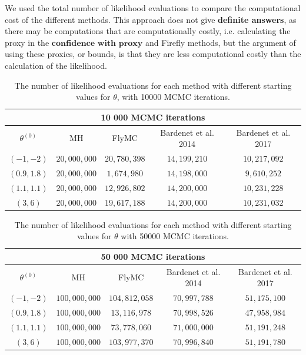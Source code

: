  We used the total number of likelihood evaluations to compare the computational cost of the different methods. This approach does not give \textbf{definite answers}, as there may be computations that are computationally costly, i.e. calculating the proxy in the $\textbf{confidence with proxy}$ and Firefly methods, but the argument of using these proxies, or bounds, is that they are less computational costly than the calculation of the likelihood. 
 
 \begin{table}[ht]
    \centering
\begin{tabular}{|c|c|c|c|c|}
  \hline
    \multicolumn{5}{|c|}{10 000 MCMC iterations} \\
    \hline
\hline
        $\theta^{\left(0\right)}$ &  MH & FlyMC & Bardenet et al. 2014 & Bardenet et al. 2017\\ 
         \hline \hline$\left(-1, -2\right)$  & $20,000,000$ & $20,780,398$ & $14,199,210$ & $10,217,092$ \\
        $\left(0.9, 1.8\right)$ & $20,000,000$ & $1,674,980$ & $14,198,000$ & $9,610,252$ \\
        $\left(1.1, 1.1\right)$ & $20,000,000$ & $12,926,802$ & $14,200,000$ & $10,231,228$
        \\ $ \left(3, 6\right) $ & $20,000,000$ & $19,617,188$ & $14,200,000$ & $10,231,032$
        \\ \hline
\end{tabular}
\caption{The number of likelihood evaluations for each method with different starting values for $\theta$, with 10000 MCMC iterations.}
\label{tab:ll_evals_10k}
\end{table} 

\begin{table}[ht]
    \centering
\begin{tabular}{|c|c|c|c|c|}
  \hline
    \multicolumn{5}{|c|}{50 000 MCMC iterations} \\
    \hline
\hline
        $\theta^{\left(0\right)}$ &  MH & FlyMC & Bardenet et al. 2014 & Bardenet et al. 2017\\ 
         \hline \hline$\left(-1, -2\right)$ & $100,000,000$ & $104,812,058$ & $70,997,788$ & $51,175,100$ \\
        $\left(0.9, 1.8\right)$ & $100,000,000$ & $13,116,978$ & $70,998,526$ & $47,958,984$ \\
        $\left(1.1, 1.1\right)$ & $100,000,000$ & $73,778,060$ & $71,000,000$ & $51,191,248$
        \\ $ \left(3,6\right)$ & $100,000,000$ & $103,977,370$ & $70,996,840$ & $51,191,780$
        \\ \hline
\end{tabular}
\caption{The number of likelihood evaluations for each method with different starting values for $\theta$ with 50000 MCMC iterations.}
\label{tab:ll_evals_50k}
\end{table} 

